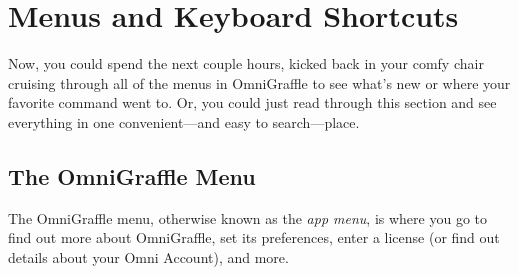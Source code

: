 \documentclass[../main.tex]{subfiles}
\begin{document}
\chapter{Menus and Keyboard Shortcuts}

Now, you could spend the next couple hours, kicked back in your comfy chair cruising through all
of the menus in OmniGraffle to see what's new or where your favorite command went to. Or, you
could just read through this section and see everything in one convenient---and easy to
search---place.

\section{The OmniGraffle Menu}

The OmniGraffle menu, otherwise known as the \textit{app menu}, is where you go to find out more
about OmniGraffle, set its preferences, enter a license (or find out details about your Omni
Account), and more.
\end{document}
